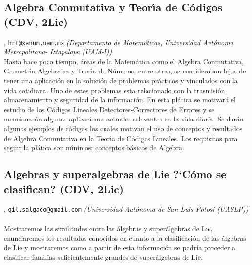 \subsection{\sffamily Algebra Conmutativa y Teor\'\i a de C\'odigos {\footnotesize (CDV, 2Lic)}} \label{reg-375} 
, {\tt hrt@xanum.uam.mx}  {\slshape (Departamento de Matem\'aticas,  Universidad Aut\'onoma Metropolitana- Iztapalapa (UAM-I))}\\
          \noindent Hasta hace poco tiempo, \'areas de la Matem\'atica como el Algebra Conmutativa, Geometr\'\i a Algebraica y Teor\'\i a de N\'umeros, entre otras, se consideraban lejos de tener una aplicaci\'on en la soluci\'on de problemas pr\'acticos y vinculados con la vida cotidiana. Uno de estos problemas esta relacionado con la trasmisi\'on, almacenamiento y seguridad de la informaci\'on. En esta pl\'atica se motivar\'a el estudio de los C\'odigos Lineales Detectores-Correctores de Errores y se mencionar\'an algunas aplicaciones actuales relevantes en la vida diaria.  Se dar\'an algunos ejemplos de c\'odigos los cuales motivan el uso de conceptos y resultados de Algebra Conmutativa en la Teor\'\i a de C\'odigos Lineales. Los requisitos para seguir la pl\'atica son m\'\i nimos: conceptos b\'asicos de Algebra.

\subsection{\sffamily Algebras y superalgebras de Lie ?`C\'omo se clasifican? {\footnotesize (CDV, 2Lic)}} \label{reg-1243} 
, {\tt gil.salgado@gmail.com}  {\slshape (Universidad Aut\'onoma de San Luis Potos\'i (UASLP))}\\
\\
\noindent Mostraremos las similitudes entre las \'algebras y super\'algebras de Lie, enunciaremos los resultados conocidos en cuanto a la clasificaci\'on de las \'algebras de Lie y mostraremos como a partir de esta informaci\'on se podr\'ia proceder a clasificar familias suficientemente grandes de super\'algebras de Lie.
